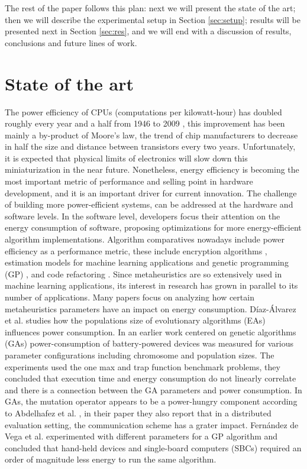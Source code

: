 \documentclass[a4paper,twoside]{article}
\begin{document}
The rest of the paper follows this plan: next we will present the state of the
art; then we will describe the experimental setup in Section \ref{sec:setup};
results will be presented next in Section \ref{sec:res}, and we will end with a
discussion of results, conclusions and future lines of work.

\section{State of the art}


The power efficiency of CPUs (computations per kilowatt-hour) has doubled
roughly every year and a half from 1946 to 2009 \cite{koomey2011web}, this
improvement has been mainly a by-product of Moore's law, the trend of chip
manufacturers to decrease in half the size and distance between transistors
every two years. Unfortunately, it is expected that physical limits of
electronics will slow down this miniaturization in the near future.
Nonetheless, energy efficiency is becoming the most important metric of
performance and selling point in hardware development, and it is an important
driver for current innovation. The challenge of building more power-efficient
systems, can be addressed at the hardware and software levels. In the software
level, developers focus their attention on the energy consumption of software,
proposing optimizations for more energy-efficient algorithm implementations.
Algorithm comparatives nowadays include power efficiency as a performance metric,
these include encryption algorithms
\cite{mota2017comparative,thakor2021lightweight}, estimation models for
machine learning applications \cite{garcia2019estimation} and genetic
programming (GP) \cite{diaz2018fuzzy}, and code refactoring \cite{ournani2021tales}. Since metaheuristics are so extensively
used in machine learning applications, its interest in research has grown in
parallel to its number of applications. Many papers focus on analyzing how
certain metaheuristics parameters have an impact on energy consumption.
Díaz-Álvarez et al. \cite{diaz2022population} studies how the populations size
of evolutionary algorithms (EAs) influences power consumption. In an earlier work 
centered on genetic algorithms (GAs) \cite{10.1007/978-3-030-45715-0_8} power-consumption of battery-powered
devices was measured for various parameter configurations including chromosome and population sizes. The
experiments used the one max and trap function benchmark problems, they concluded 
that execution time and energy consumption do not linearly correlate and there
is a connection between the GA parameters and power consumption.
In GAs, the mutation operator appears to be a power-hungry component according
to Abdelhafez et al. \cite{abdelhafez2019component}, in their paper they also
report that in a distributed evaluation setting, the communication scheme has a
grater impact. Fernández de Vega et al. \cite{10.1007/978-3-319-45823-6_51}
experimented with different parameters for a GP algorithm and concluded that
hand-held devices and single-board computers (SBCs) required an order of
magnitude less energy to run the same algorithm. 
\end{document}
